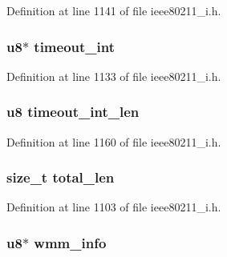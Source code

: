 Definition at line 1141 of file ieee80211\-\_\-i.\-h.

\hypertarget{structieee802__11__elems_a426d32f8654b0c568ef8419d2ff4b775}{
\subsubsection[{timeout\-\_\-int}]{\setlength{\rightskip}{0pt plus 5cm}u8$\ast$ timeout\-\_\-int}}\label{structieee802__11__elems_a426d32f8654b0c568ef8419d2ff4b775}


Definition at line 1133 of file ieee80211\-\_\-i.\-h.

\hypertarget{structieee802__11__elems_a95b4deaebcafd728c67639bd307e91e8}{
\subsubsection[{timeout\-\_\-int\-\_\-len}]{\setlength{\rightskip}{0pt plus 5cm}u8 timeout\-\_\-int\-\_\-len}}\label{structieee802__11__elems_a95b4deaebcafd728c67639bd307e91e8}


Definition at line 1160 of file ieee80211\-\_\-i.\-h.

\hypertarget{structieee802__11__elems_aa117fc7f9adae4a74d56508b20f7de1f}{
\subsubsection[{total\-\_\-len}]{\setlength{\rightskip}{0pt plus 5cm}size\-\_\-t total\-\_\-len}}\label{structieee802__11__elems_aa117fc7f9adae4a74d56508b20f7de1f}


Definition at line 1103 of file ieee80211\-\_\-i.\-h.

\hypertarget{structieee802__11__elems_a1051a8e53a01158ff3f9675d8ec9c6e5}{
\subsubsection[{wmm\-\_\-info}]{\setlength{\rightskip}{0pt plus 5cm}u8$\ast$ wmm\-\_\-info}}\label{structieee802__11__elems_a1051a8e53a01158ff3f9675d8ec9c6e5}


